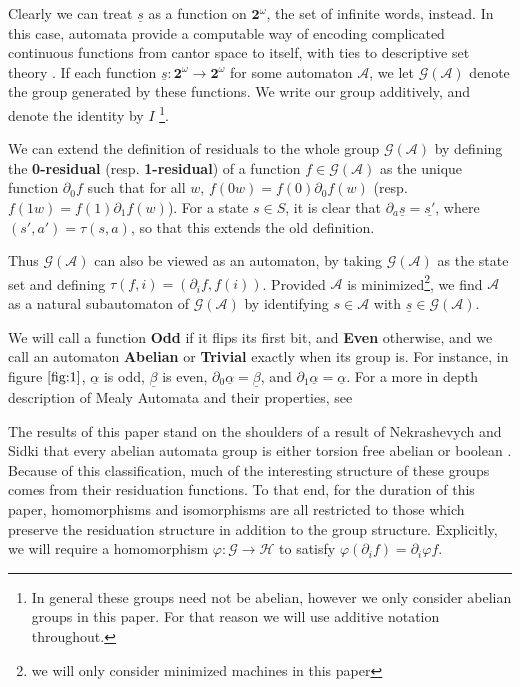 \documentclass[final]{ws-ijac}
\newcommand{\A}{\mathcal{A}}
\newcommand{\G}{\mathcal{G}}
\newcommand{\2}{\textbf{2}}
\newcommand{\del}{\partial}
\begin{document}
Clearly we can treat $\underline{s}$ as a function 
on $\2^\omega$, the set of infinite words, instead. In this case, automata 
provide a computable way of encoding complicated continuous functions from 
cantor space to itself, with ties to descriptive set theory \cite{skrzypczak15:descriptive}. 
If each function $\underline{s} : \2^\omega \to \2^\omega$ for some 
automaton $\A$, we let $\G(\A)$ denote the group generated by these functions. 
We write our group additively, and denote the identity by $I$%
\footnote{In general these groups need not be abelian, however we only consider
abelian groups in this paper. For that reason we will use additive notation
throughout.}.

We can extend the definition of residuals to the whole group $\G(\A)$ by
defining the \textbf{0-residual} (resp. \textbf{1-residual}) of a 
function $f \in \G(\A)$ as the unique function 
$\del_0 f$ such that for all $w$, $f(0w) = f(0) \del_0 f(w)$ 
(resp. $f(1w) = f(1) \del_1 f(w)$). 
For a state $s \in S$, it is clear that 
$\del_a \underline{s} = \underline{s'}$, where $(s',a') = \tau(s,a)$, so
that this extends the old definition. 

Thus $\G(\A)$ can also be viewed as an automaton, by taking $\G(\A)$ 
as the state set and defining $\tau(f,i) = (\del_i f, f(i))$. Provided $\A$
is minimized\footnote{we will only consider minimized machines in this paper}, 
we find $\A$ as a natural subautomaton of $\G(\A)$ by identifying 
$s \in \A$ with $\underline{s} \in \G(\A)$.

We will call a function \textbf{Odd} if it flips its first bit, and 
\textbf{Even} otherwise, and we call an automaton \textbf{Abelian} or 
\textbf{Trivial} exactly when its group is. 
For instance, in figure $\ref{fig:1}$, $\underline{\alpha}$ is odd, $\underline{\beta}$ 
is even, $\del_0 \underline{\alpha} = \underline{\beta}$, 
and $\del_1 \underline{\alpha} = \underline{\alpha}$.
For a more in depth description of Mealy Automata and their properties, 
see \cite{Sakarovitch09:automata_theory,Holcombe,SutnerLewi12:iter_inver_bin_trans}

The results of this paper stand on the shoulders of a result of Nekrashevych and 
Sidki that every abelian automata group is either torsion free abelian or 
boolean \cite{NekrashevychSidki04:automorphisms}. Because of this classification, 
much of the interesting structure of these groups comes from their residuation
functions. To that end, for the duration of this paper, 
homomorphisms and isomorphisms are all restricted to those 
which preserve the residuation structure in addition to the group structure.
Explicitly, we will require a homomorphism $\varphi : \G \to \mathcal{H}$ to 
satisfy $\varphi (\del_i f) = \del_i \varphi f$.
\end{document}
